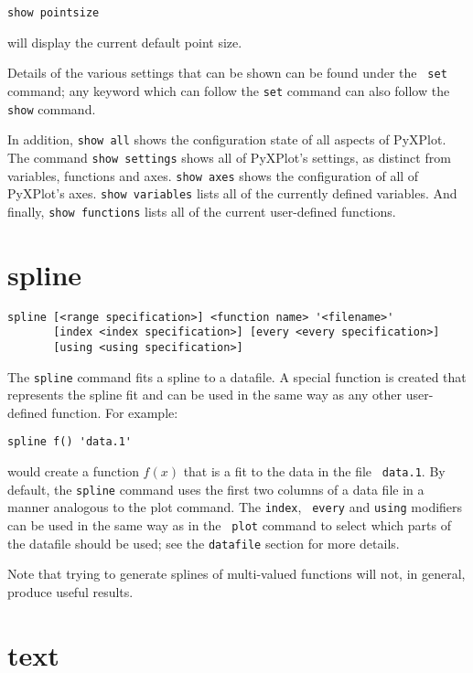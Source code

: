 \documentclass[a4paper,onecolumn,11pt]{book}
\begin{document}
\begin{verbatim}
show pointsize
\end{verbatim}

\noindent will display the current default point size.

Details of the various settings that can be shown can be found under the {\tt
set} command; any keyword which can follow the {\tt set} command can also follow
the {\tt show} command.

In addition, {\tt show all} shows the configuration state of all aspects of
PyXPlot. The command {\tt show settings} shows all of PyXPlot's settings, as
distinct from variables, functions and axes. {\tt show axes} shows the
configuration of all of PyXPlot's axes. {\tt show variables} lists all of the
currently defined variables. And finally, {\tt show functions} lists all of the
current user-defined functions.


\section{spline}

\begin{verbatim}
spline [<range specification>] <function name> '<filename>' 
       [index <index specification>] [every <every specification>]
       [using <using specification>]
\end{verbatim}

The {\tt spline} command fits a spline to a datafile. A special function is
created that represents the spline fit and can be used in the same way as any
other user-defined function. For example:

\begin{verbatim}
spline f() 'data.1'
\end{verbatim}

\noindent would create a function $f(x)$ that is a fit to the data in the file {\tt
data.1}. By default, the {\tt spline} command uses the first two columns of a
data file in a manner analogous to the plot command. The {\tt index}, {\tt
every} and {\tt using} modifiers can be used in the same way as in the {\tt
plot} command to select which parts of the datafile should be used; see the
{\tt datafile} section for more details.

Note that trying to generate splines of multi-valued functions will not, in
general, produce useful results.

\section{text}
\end{document}
